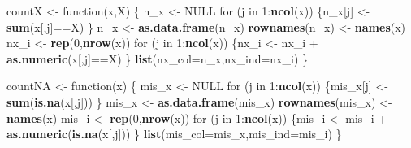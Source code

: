 \documentclass[]{article}
\newenvironment{Shaded}{\begin{snugshade}}{\end{snugshade}}
\newcommand{\KeywordTok}[1]{\textcolor[rgb]{0.13,0.29,0.53}{\textbf{{#1}}}}
\newcommand{\DataTypeTok}[1]{\textcolor[rgb]{0.13,0.29,0.53}{{#1}}}
\newcommand{\DecValTok}[1]{\textcolor[rgb]{0.00,0.00,0.81}{{#1}}}
\newcommand{\StringTok}[1]{\textcolor[rgb]{0.31,0.60,0.02}{{#1}}}
\newcommand{\OtherTok}[1]{\textcolor[rgb]{0.56,0.35,0.01}{{#1}}}
\newcommand{\NormalTok}[1]{{#1}}
\begin{document}
\begin{Shaded}
\begin{Highlighting}[]
\NormalTok{countX <-}\StringTok{ }\NormalTok{function(x,X) \{}
  \NormalTok{n_x <-}\StringTok{ }\OtherTok{NULL}
  \NormalTok{for (j in }\DecValTok{1}\NormalTok{:}\KeywordTok{ncol}\NormalTok{(x)) \{n_x[j] <-}\StringTok{ }\KeywordTok{sum}\NormalTok{(x[,j]==X) \}}
  \NormalTok{n_x <-}\StringTok{ }\KeywordTok{as.data.frame}\NormalTok{(n_x)}
  \KeywordTok{rownames}\NormalTok{(n_x) <-}\StringTok{ }\KeywordTok{names}\NormalTok{(x)}
  \NormalTok{nx_i <-}\StringTok{ }\KeywordTok{rep}\NormalTok{(}\DecValTok{0}\NormalTok{,}\KeywordTok{nrow}\NormalTok{(x))}
  \NormalTok{for (j in }\DecValTok{1}\NormalTok{:}\KeywordTok{ncol}\NormalTok{(x)) \{nx_i <-}\StringTok{ }\NormalTok{nx_i +}\StringTok{ }\KeywordTok{as.numeric}\NormalTok{(x[,j]==X) \}}
  \KeywordTok{list}\NormalTok{(}\DataTypeTok{nx_col=}\NormalTok{n_x,}\DataTypeTok{nx_ind=}\NormalTok{nx_i) \}}

\NormalTok{countNA <-}\StringTok{ }\NormalTok{function(x) \{}
  \NormalTok{mis_x <-}\StringTok{ }\OtherTok{NULL}
  \NormalTok{for (j in }\DecValTok{1}\NormalTok{:}\KeywordTok{ncol}\NormalTok{(x)) \{mis_x[j] <-}\StringTok{ }\KeywordTok{sum}\NormalTok{(}\KeywordTok{is.na}\NormalTok{(x[,j])) \}}
  \NormalTok{mis_x <-}\StringTok{ }\KeywordTok{as.data.frame}\NormalTok{(mis_x)}
  \KeywordTok{rownames}\NormalTok{(mis_x) <-}\StringTok{ }\KeywordTok{names}\NormalTok{(x)}
  \NormalTok{mis_i <-}\StringTok{ }\KeywordTok{rep}\NormalTok{(}\DecValTok{0}\NormalTok{,}\KeywordTok{nrow}\NormalTok{(x))}
  \NormalTok{for (j in }\DecValTok{1}\NormalTok{:}\KeywordTok{ncol}\NormalTok{(x)) \{mis_i <-}\StringTok{ }\NormalTok{mis_i +}\StringTok{ }\KeywordTok{as.numeric}\NormalTok{(}\KeywordTok{is.na}\NormalTok{(x[,j])) \}}
  \KeywordTok{list}\NormalTok{(}\DataTypeTok{mis_col=}\NormalTok{mis_x,}\DataTypeTok{mis_ind=}\NormalTok{mis_i) \}}


\end{Highlighting}
\end{Shaded}
\end{document}
